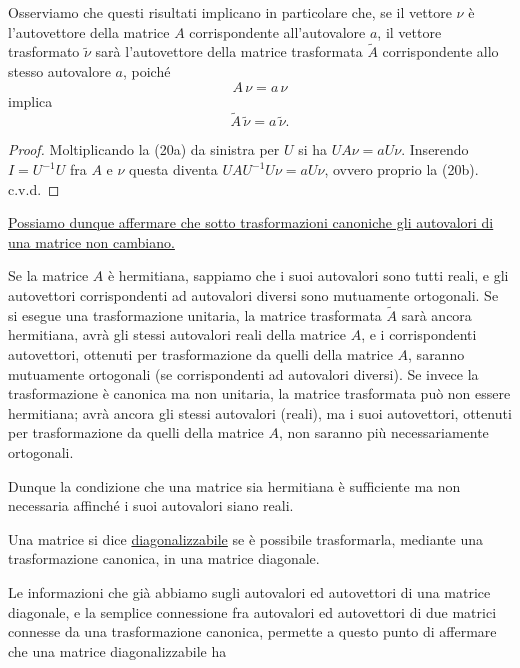 \documentclass[11pt, a4paper]{book}
\numberwithin{equation}{section}
\begin{document}

Osserviamo che questi risultati implicano in particolare che, se il
vettore $\nu$ è l'autovettore della matrice $A$ corrispondente
all'autovalore $a$, il vettore trasformato $\widetilde{\nu}$ sarà
l'autovettore della matrice trasformata $\widetilde{A}$ corrispondente
allo stesso autovalore $a$, poiché
\begin{equation}
A\,\nu = a\,\nu \tag{20a}
\end{equation}
implica
\begin{equation}
\widetilde{A}\,\widetilde{\nu} = a\,\widetilde{\nu}. \tag{20b}
\end{equation}

\begin{proof}
Moltiplicando la (20a) da sinistra per $U$ si ha $UA\nu = aU\nu$.
Inserendo $I = U^{-1}U$ fra $A$ e $\nu$ questa diventa
$UAU^{-1}U\nu = aU\nu$,
ovvero proprio la (20b). c.v.d.
\end{proof}

\uline{Possiamo dunque affermare che sotto trasformazioni canoniche gli
autovalori di una matrice non cambiano.}

Se la matrice $A$ è hermitiana, sappiamo che i suoi autovalori sono
tutti reali, e gli autovettori corrispondenti ad autovalori diversi sono
mutuamente ortogonali. Se si esegue una trasformazione unitaria, la
matrice trasformata $\widetilde{A}$ sarà ancora hermitiana, avrà gli
stessi autovalori reali della matrice $A$, e i corrispondenti autovettori,
ottenuti per trasformazione da quelli della matrice $A$, saranno
mutuamente ortogonali (se corrispondenti ad autovalori diversi). Se invece
la trasformazione è canonica ma non unitaria, la matrice trasformata può
non essere hermitiana; avrà ancora gli stessi autovalori (reali), ma i
suoi autovettori, ottenuti per trasformazione da quelli della matrice $A$,
non saranno più necessariamente ortogonali.

Dunque la condizione che una matrice sia hermitiana è sufficiente ma non
necessaria affinché i suoi autovalori siano reali.

Una matrice si dice \underline{diagonalizzabile} se è possibile
trasformarla, mediante una trasformazione canonica, in una matrice
diagonale.

Le informazioni che già abbiamo sugli autovalori ed autovettori di una
matrice diagonale, e la semplice connessione fra autovalori ed autovettori
di due matrici connesse da una trasformazione canonica, permette a questo
punto di affermare che una matrice diagonalizzabile ha
\end{document}

